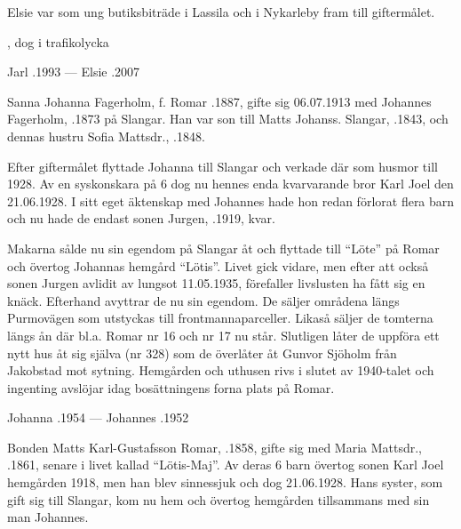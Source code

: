 Elsie var som ung butiksbiträde i Lassila och i Nykarleby fram till giftermålet.
\begin{jhchildren}
  \item {}
  \item {}, dog i trafikolycka
\end{jhchildren}

Jarl .1993  ---  Elsie .2007




Sanna Johanna Fagerholm, f. Romar .1887, gifte sig 06.07.1913 med Johannes Fagerholm, .1873 på Slangar. Han var son till Matts Johanss. Slangar, .1843, och dennas hustru Sofia Mattsdr., .1848.

Efter giftermålet flyttade Johanna till Slangar och verkade där som husmor till 1928. Av en syskonskara på 6 dog nu hennes enda kvarvarande bror Karl Joel den 21.06.1928. I sitt eget äktenskap med Johannes hade hon redan förlorat flera barn och nu hade de endast sonen Jurgen, .1919, kvar.


Makarna sålde nu sin egendom på Slangar åt  och flyttade till ``Löte'' på Romar och övertog Johannas hemgård  ``Lötis''. Livet gick vidare, men efter att också sonen Jurgen avlidit av lungsot 11.05.1935, förefaller livslusten ha fått sig en knäck. Efterhand avyttrar de nu sin egendom. De säljer områdena  längs Purmovägen som utstyckas till frontmannaparceller. Likaså säljer de tomterna längs ån där bl.a.  Romar nr 16 och nr 17 nu står. Slutligen låter de uppföra ett nytt hus åt sig själva (nr 328) som de överlåter åt Gunvor Sjöholm från Jakobstad mot sytning. Hemgården och uthusen rivs i slutet av 1940-talet och ingenting avslöjar idag bosättningens forna plats på Romar.

Johanna .1954  ---  Johannes .1952


Bonden Matts Karl-Gustafsson Romar, .1858, gifte sig med Maria Mattsdr., .1861, senare i livet kallad ``Lötis-Maj''. Av deras 6 barn övertog sonen Karl Joel hemgården 1918, men han blev sinnessjuk och dog 21.06.1928. Hans syster, som gift sig till Slangar, kom nu hem och övertog hemgården tillsammans med sin man Johannes.

